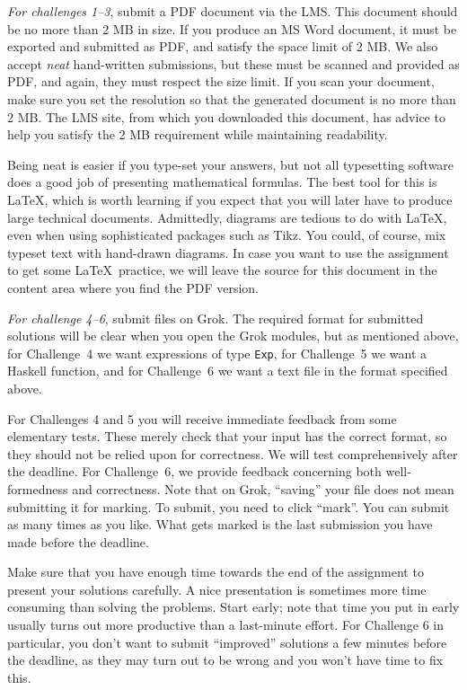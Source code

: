\documentclass[12pt]{article}
\begin{document}
\emph{For challenges 1--3}, submit a PDF document via the LMS.
This document should be no more than 2 MB in size.
If you produce an MS Word document, it must be exported
and submitted as PDF, and satisfy the space limit of 2 MB.
We also accept \emph{neat} hand-written submissions, but these must be
scanned and provided as PDF, and again, they must respect the size limit.
If you scan your document, make sure you set the resolution so that
the generated document is no more than 2 MB.
The LMS site, from which you downloaded this document, 
has advice to help you satisfy the 2 MB requirement while 
maintaining readability.

Being neat is easier if you type-set your answers, but not all
typesetting software does a good job of presenting mathematical formulas.
The best tool for this is \LaTeX, which is worth learning if you expect
that you will later have to produce large technical documents.
Admittedly, diagrams are tedious to do with \LaTeX,
even when using sophisticated packages such as Tikz.
You could, of course, mix typeset text with hand-drawn diagrams.
In case you want to use the assignment to get some \LaTeX\ practice,
we will leave the source for this document in the
content area where you find the PDF version.

\emph{For challenge 4--6}, submit files on Grok.
The required format for submitted solutions will be clear
when you open the Grok modules, but as mentioned above, 
for Challenge~4 we want expressions of type \verb!Exp!,
for Challenge~5 we want a Haskell function,
and for Challenge~6 we want a text file in the format specified above.

For Challenges 4 and 5 you will
receive immediate feedback from some elementary tests.
These merely check that your input has the correct format, 
so they should not be relied upon for correctness.
We will test comprehensively after the deadline.
For Challenge~6, we provide feedback concerning both
well-formedness and correctness.
Note that on Grok, ``saving'' your file does not mean 
submitting it for marking. 
To submit, you need to click ``mark''.
You can submit as many times as you like.
What gets marked is the last submission you have made before the deadline.

Make sure that you have enough time towards the end of the assignment
to present your solutions carefully.
A nice presentation is sometimes more time consuming than solving the
problems.
Start early; note that time you put in early usually turns out more
productive than a last-minute effort.
For Challenge 6 in particular, you don't want to submit ``improved''
solutions a few minutes before the deadline, as they may turn out
to be wrong and you won't have time to fix this.
\end{document}
